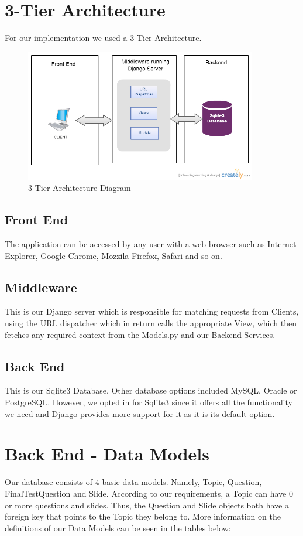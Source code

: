 \documentclass{l3proj}
\begin{document}
\section{3-Tier Architecture}
For our implementation we used a 3-Tier Architecture.
\begin{figure}[!htb]
\caption{3-Tier Architecture Diagram}
\centering
\includegraphics[width=0.9\textwidth]{images/ntier.jpg}
\end{figure}
\subsection{Front End}
The application can be accessed by any user with a web browser such as Internet 
Explorer, Google Chrome, Mozzila Firefox, Safari and so on. \\
\subsection{Middleware}
This is our Django server which is responsible for matching requests from Clients, using the 
URL dispatcher which in return calls the appropriate View, which then fetches any 
required context from the Models.py and our Backend Services. 
\subsection{Back End}
This is our Sqlite3 Database. Other database options included MySQL, Oracle or 
PostgreSQL. However, we opted in for Sqlite3 since it offers all the functionality we 
need and Django provides more support for it as it is its default option. \\
\section{Back End - Data Models}
Our database consists of 4 basic data models. Namely, Topic, Question, FinalTestQuestion and Slide. According to our requirements, a Topic can have 0 or more questions and slides. Thus, the Question and Slide objects both have a foreign key that points to the Topic they belong to. More information on the definitions of our Data Models can be seen in the tables below: 
\end{document}
